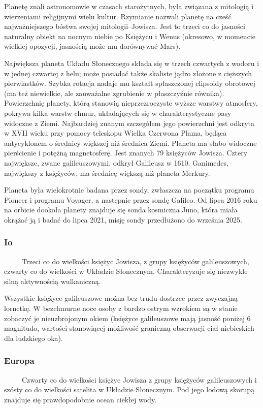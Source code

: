 \documentclass[12pt, letterpaper, titlepage]{article}
\begin{document}
Planetę znali astronomowie w czasach starożytnych, była związana z mitologią i wierzeniami religijnymi wielu kultur. Rzymianie nazwali planetę na cześć najważniejszego bóstwa swojej mitologii–Jowisza. Jest to trzeci co do jasności naturalny obiekt na nocnym niebie po Księżycu i Wenus (okresowo, w momencie wielkiej opozycji, jasnością może mu dorównywać Mars).

Największa planeta Układu Słonecznego składa się w trzech czwartych z wodoru i w jednej czwartej z helu; może posiadać także skaliste jądro złożone z cięższych pierwiastków. Szybka rotacja nadaje mu kształt spłaszczonej elipsoidy obrotowej (ma też niewielkie, ale zauważalne zgrubienie w płaszczyźnie równika). Powierzchnię planety, którą stanowią nieprzezroczyste wyższe warstwy atmosfery, pokrywa kilka warstw chmur, układających się w charakterystyczne pasy widoczne z Ziemi. Najbardziej znanym szczegółem jego powierzchni jest odkryta w XVII wieku przy pomocy teleskopu Wielka Czerwona Plama, będąca antycyklonem o średnicy większej niż średnica Ziemi. Planeta ma słabo widoczne pierścienie i potężną magnetosferę. Jest znanych 79 księżyców Jowisza. Cztery największe, zwane galileuszowymi, odkrył Galileusz w 1610. Ganimedes, największy z księżyców, ma średnicę większą niż planeta Merkury.

Planeta była wielokrotnie badana przez sondy, zwłaszcza na początku programu Pioneer i programu Voyager, a następnie przez sondę Galileo. Od lipca 2016 roku na orbicie dookoła planety znajduje się sonda kosmiczna Juno, która miała okrążać ją i badać do lipca 2021, misję sondy przedłużono do września 2025.
\subsubsection{Io}
\ \ \ \ \ Trzeci co do wielkości księżyc Jowisza, z grupy księżyców galileuszowych, czwarty co do wielkości w Układzie Słonecznym. Charakteryzuje się niezwykle silną aktywnością wulkaniczną.

Wszystkie księżyce galileuszowe można bez trudu dostrzec przez zwyczajną lornetkę. W bezchmurne noce osoby z bardzo ostrym wzrokiem są w stanie zobaczyć je nieuzbrojonym okiem (księżyce galileuszowe mają jasność poniżej 6 magnitudo, wartości stanowiącej możliwość graniczną obserwacji ciał niebieskich dla ludzkiego oka).
\subsubsection{Europa}
\ \ \ \ \ Czwarty co do wielkości księżyc Jowisza z grupy księżyców galileuszowych i szósty co do wielkości satelita w Układzie Słonecznym. Pod jego lodową skorupą znajduje się prawdopodobnie ocean ciekłej wody.
\end{document}

